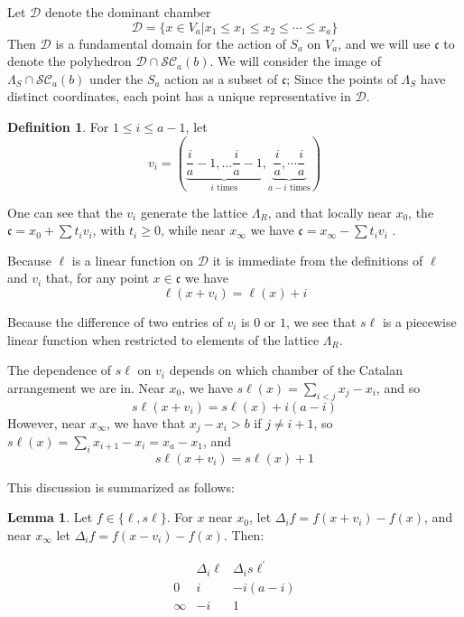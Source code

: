 \documentclass{amsart}[12pt]
\theoremstyle{definition}
\newtheorem{lemma}[dummy]{Lemma}
\newtheorem{definition}[dummy]{Definition}
\newcommand{\SC}{\mathcal{SC}}
\newcommand{\sk}{s\ell}
\newcommand{\cone}{\mathfrak{c}}
\newcommand{\dominant}{\mathcal{D}}
\begin{document}
\subsubsection{} 
Let $\dominant$ denote the dominant chamber $$\dominant=\{x\in V_a|x_1\leq x_1\leq x_2\leq\cdots\leq x_a\}$$
Then $\dominant$ is a fundamental domain for the action of $S_a$ on $V_a$, and we will use $\cone$ to denote the polyhedron $\dominant\cap\SC_{a}(b)$.  We will consider the image of $\Lambda_S\cap \SC_{a}(b)$ under the $S_a$ action as a subset of $\cone$;  Since the points of $\Lambda_S$ have distinct coordinates, each point has a unique representative in $\dominant$.  




\begin{definition}

For $1\leq i\leq a-1$, let $$v_i=\left(\underbrace{\frac{i}{a}-1,\dots \frac{i}{a}-1}_{i \text{ times}},\underbrace{ \frac{i}{a},\dotsm\frac{i}{a}}_{a-i \text{ times}}\right)$$
\end{definition}



One can see that the $v_i$ generate the lattice $\Lambda_R$, and that locally near $x_0$, the $\cone=x_0+\sum t_i v_i$, with $t_i\geq 0$, while near $x_\infty$ we have $\cone=x_\infty-\sum t_iv_i$ .

Because $\ell$ is a linear function on $\dominant$ it is immediate from the definitions of $\ell$ and $v_i$ that, for any point $x\in\cone$ we have  
$$\ell(x+v_i)=\ell(x)+i$$

Because the difference of two entries of $v_i$ is $0$ or $1$, we see that $\sk$ is a piecewise linear function when restricted to elements of the lattice $\Lambda_R$.

The dependence of $\sk$ on $v_i$ depends on which chamber of the Catalan arrangement we are in.  Near $x_0$, we have $\sk(x)=\sum_{i<j} x_j-x_i$, and so
$$\sk(x+v_i) = \sk(x)+i(a-i)$$
However, near $x_\infty$, we have that $x_j-x_i>b$ if $j\neq i+1$, so $\sk(x)=\sum_i x_{i+1}-x_i=x_a-x_1$, and
$$\sk(x+v_i)=\sk(x)+1$$

This discussion is summarized as follows:

\begin{lemma} \label{lem:table}
Let $f\in\{\ell,\sk\}$.  For $x$ near $x_0$, let $\Delta_if=f(x+v_i)-f(x)$, and near $x_\infty$ let $\Delta_if=f(x-v_i)-f(x)$.  Then:

$$\begin{array}{r|cc}
 & \Delta_i\ell & \Delta_i\sk^\prime \\
\hline
0 & i & -i(a-i) \\
\infty & -i & 1
\end{array}
$$
\end{lemma}
\end{document}
